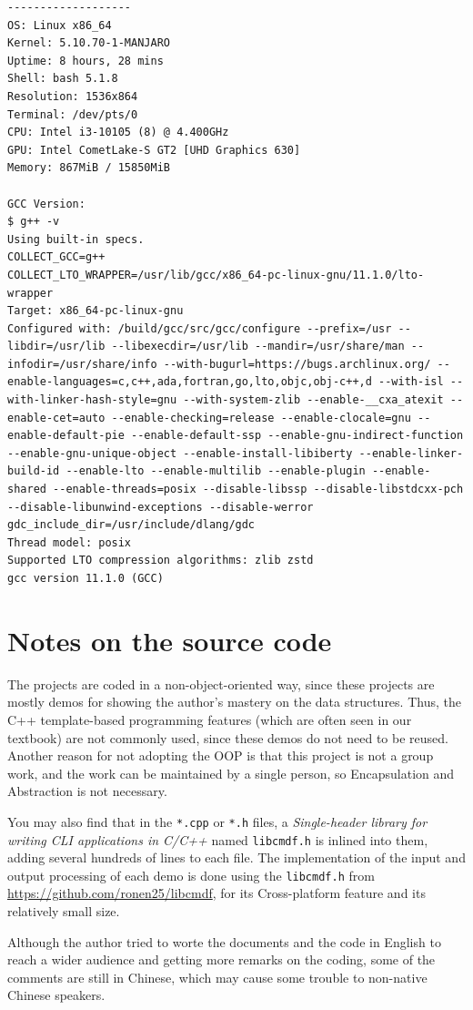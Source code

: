 \documentclass[cn,black,12pt,normal]{elegantnote}
\begin{document}
\begin{lstlisting}
-------------------
OS: Linux x86_64
Kernel: 5.10.70-1-MANJARO
Uptime: 8 hours, 28 mins
Shell: bash 5.1.8
Resolution: 1536x864
Terminal: /dev/pts/0
CPU: Intel i3-10105 (8) @ 4.400GHz
GPU: Intel CometLake-S GT2 [UHD Graphics 630]
Memory: 867MiB / 15850MiB

GCC Version:
$ g++ -v
Using built-in specs.
COLLECT_GCC=g++
COLLECT_LTO_WRAPPER=/usr/lib/gcc/x86_64-pc-linux-gnu/11.1.0/lto-wrapper
Target: x86_64-pc-linux-gnu
Configured with: /build/gcc/src/gcc/configure --prefix=/usr --libdir=/usr/lib --libexecdir=/usr/lib --mandir=/usr/share/man --infodir=/usr/share/info --with-bugurl=https://bugs.archlinux.org/ --enable-languages=c,c++,ada,fortran,go,lto,objc,obj-c++,d --with-isl --with-linker-hash-style=gnu --with-system-zlib --enable-__cxa_atexit --enable-cet=auto --enable-checking=release --enable-clocale=gnu --enable-default-pie --enable-default-ssp --enable-gnu-indirect-function --enable-gnu-unique-object --enable-install-libiberty --enable-linker-build-id --enable-lto --enable-multilib --enable-plugin --enable-shared --enable-threads=posix --disable-libssp --disable-libstdcxx-pch --disable-libunwind-exceptions --disable-werror gdc_include_dir=/usr/include/dlang/gdc
Thread model: posix
Supported LTO compression algorithms: zlib zstd
gcc version 11.1.0 (GCC)

\end{lstlisting}

\section{Notes on the source code}

The projects are coded in a non-object-oriented way, since these projects are mostly demos for showing the author's mastery on the data structures. Thus, the C++ template-based programming features (which are often seen in our textbook) are not commonly used, since these demos do not need to be reused. Another reason for not adopting the OOP is that this project is not a group work, and the work can be maintained by a single person, so Encapsulation and Abstraction is not necessary.

You may also find that in the \lstinline{*.cpp} or \lstinline{*.h} files, a \textit{Single-header library for writing CLI applications in C/C++} named \lstinline{libcmdf.h} is inlined into them, adding several hundreds of lines to each file. The implementation of the input and output processing of each demo is done using the \lstinline{libcmdf.h} from \url{https://github.com/ronen25/libcmdf}, for its Cross-platform feature and its relatively small size.

Although the author tried to worte the documents and the code in English to reach a wider audience and getting more remarks on the coding, some of the comments are still in Chinese, which may cause some trouble to non-native Chinese speakers.
\end{document}
